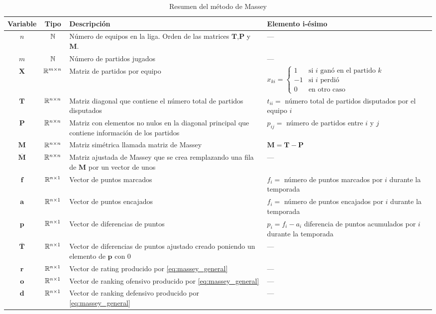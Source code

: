\begin{longtable}{c c p{5cm} p{6cm}}
\caption{Resumen del método de Massey}\\
\toprule
Variable & Tipo & Descripción & Elemento i-ésimo\\
\hline
\endfirsthead

$n$ & $\mathbb{N}$ & Número de equipos en la liga. Orden de las matrices $\mathbf{T}$,$\mathbf{P}$ y $\mathbf{M}$. & ---\\
\hline
$m$ & $\mathbb{N}$ & Número de partidos jugados & ---\\
\hline
$\mathbf{X}$ & $\mathbb{R}^{m\times n}$ & Matriz de partidos por equipo & $x_{ki} = \begin{cases}
1 & \text{si } i \text{ ganó en el partido } k \\
 -1 & \text{si } i \text{ perdió} \\ 
0 & \text{en otro caso}
\end{cases}$ \\
\hline
$\mathbf{T}$ & $\mathbb{R}^{n\times n}$ & Matriz diagonal que contiene el número total de partidos disputados & $t_{ii} = $ número total de partidos disputados por el equipo $i$ \\
\hline
$\mathbf{P}$ & $\mathbb{R}^{n\times n}$ & Matriz con elementos no nulos en la diagonal principal que contiene información de los partidos & $p_{ij} = $ número de partidos entre $i$ y $j$ \\
\hline
$\mathbf{M}$ & $\mathbb{R}^{n\times n}$ & Matriz simétrica llamada matriz de Massey & $\mathbf{M} = \mathbf{T}-\mathbf{P}$ \\
\hline 
$\overline{\mathbf{M}}$ & $\mathbb{R}^{n \times n}$ & Matriz ajustada de Massey que se crea remplazando una fila de $\mathbf{M}$ por un vector de unos & --- \\
\hline 
$\mathbf{f}$ & $\mathbb{R}^{n\times 1}$ & Vector de puntos marcados & $f_i = $ número de puntos  marcados por $i$ durante la temporada \\
\hline 
$\mathbf{a}$ & $\mathbb{R}^{n\times 1}$ & Vector de puntos encajados & $f_i = $ número de puntos encajados por $i$ durante la temporada \\
\hline 
$\mathbf{p}$ & $\mathbb{R}^{n\times 1}$ & Vector de diferencias de puntos & $p_i = f_i - a_i$ diferencia de puntos acumulados por $i$ durante la temporada \\
\hline 
$\overline{\mathbf{T}}$ & $\mathbb{R}^{n\times 1}$ & Vector de diferencias de puntos ajustado creado poniendo un  elemento de $\mathbf{p}$ con $0$ & ---\\
\hline
$\mathbf{r}$ & $\mathbb{R}^{n\times 1}$ & Vector de rating producido por 
\ref{eq:massey_general} & ---\\
\hline
$\mathbf{o}$ & $\mathbb{R}^{n\times 1}$ & Vector de ranking ofensivo producido
por \ref{eq:massey_general} & ---\\
\hline 
$\mathbf{d}$ & $\mathbb{R}^{n\times 1}$ & Vector de ranking defensivo producido por \ref{eq:massey_general} & ---\\

\bottomrule
\end{longtable}


